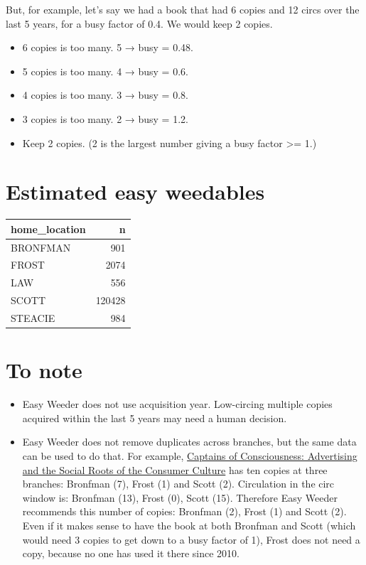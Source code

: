 \documentclass[11pt]{article}
\begin{document}
But, for example, let's say we had a book that had 6 copies and 12 circs over the last 5 years, for a busy factor of 0.4.  We would keep 2 copies.

\begin{itemize}
\item 6 copies is too many.  5 → busy = 0.48.
\item 5 copies is too many.  4 → busy = 0.6.
\item 4 copies is too many.  3 → busy = 0.8.
\item 3 copies is too many.  2 → busy = 1.2.
\item Keep 2 copies.  (2 is the largest number giving a busy factor >= 1.)
\end{itemize}

\section*{Estimated easy weedables}
\label{sec:org6bde7b9}

\begin{center}
\begin{tabular}{lr}
home\_location & n\\
\hline
BRONFMAN & 901\\
FROST & 2074\\
LAW & 556\\
SCOTT & 120428\\
STEACIE & 984\\
\end{tabular}
\end{center}

\section*{To note}
\label{sec:org5fa3765}

\begin{itemize}
\item Easy Weeder does not use acquisition year.  Low-circing multiple copies acquired within the last 5 years may need a human decision.
\item Easy Weeder does not remove duplicates across branches, but the same data can be used to do that. For example, \href{https://www.library.yorku.ca/find/Record/1172}{Captains of Consciousness: Advertising and the Social Roots of the Consumer Culture} has ten copies at three branches: Bronfman (7), Frost (1) and Scott (2).  Circulation in the circ window is: Bronfman (13), Frost (0), Scott (15).  Therefore Easy Weeder recommends this number of copies: Bronfman (2), Frost (1) and Scott (2).  Even if it makes sense to have the book at both Bronfman and Scott (which would need 3 copies to get down to a busy factor of 1), Frost does not need a copy, because no one has used it there since 2010.
\end{itemize}
\end{document}
